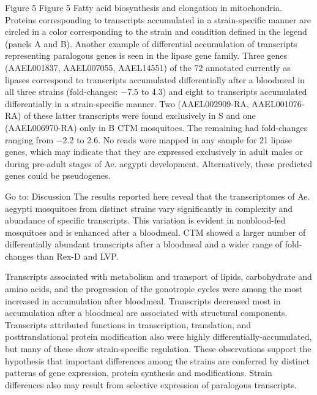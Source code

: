 Figure 5 
Figure 5 
Fatty acid biosynthesis and elongation in mitochondria. Proteins corresponding to transcripts accumulated in a strain-specific manner are circled in a color corresponding to the strain and condition defined in the legend (panels A and B).
Another example of differential accumulation of transcripts representing paralogous genes is seen in the lipase gene family. Three genes (AAEL001837, AAEL007055, AAEL14551) of the 72 annotated currently as lipases correspond to transcripts accumulated differentially after a bloodmeal in all three strains (fold-changes: −7.5 to 4.3) and eight to transcripts accumulated differentially in a strain-specific manner. Two (AAEL002909-RA, AAEL001076-RA) of these latter transcripts were found exclusively in S and one (AAEL006970-RA) only in B CTM mosquitoes. The remaining had fold-changes ranging from −2.2 to 2.6. No reads were mapped in any sample for 21 lipase genes, which may indicate that they are expressed exclusively in adult males or during pre-adult stages of Ae. aegypti development. Alternatively, these predicted genes could be pseudogenes.


Go to:
Discussion
The results reported here reveal that the transcriptomes of Ae. aegypti mosquitoes from distinct strains vary significantly in complexity and abundance of specific transcripts. This variation is evident in nonblood-fed mosquitoes and is enhanced after a bloodmeal. CTM showed a larger number of differentially abundant transcripts after a bloodmeal and a wider range of fold-changes than Rex-D and LVP. 

Transcripts associated with metabolism and transport of lipids, carbohydrate and amino acids, and the progression of the gonotropic cycles were among the most increased in accumulation after bloodmeal. Transcripts decreased most in accumulation after a bloodmeal are associated with structural components. Transcripts attributed functions in transcription, translation, and posttranslational protein modification also were highly differentially-accumulated, but many of these show strain-specific regulation. These observations support the hypothesis that important differences among the strains are conferred by distinct patterns of gene expression, protein synthesis and modifications. Strain differences also may result from selective expression of paralogous transcripts.

